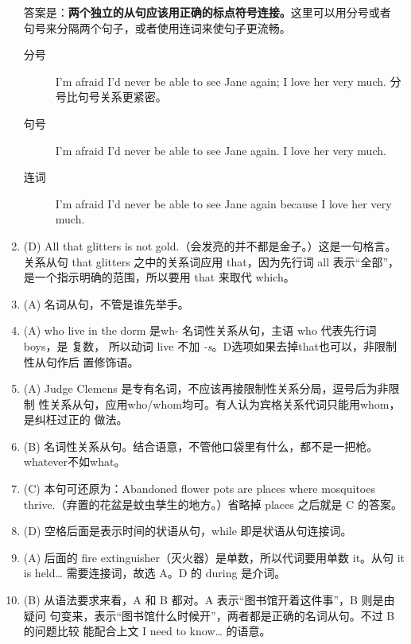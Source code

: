 \begin{enumerate}
  答案是：\textbf{两个独立的从句应该用正确的标点符号连接。}这里可以用分号或者
  句号来分隔两个句子，或者使用连词来使句子更流畅。
  \begin{description}
  \item[分号] I'm afraid I'd never be able to see Jane again; I love
    her very much. 分号比句号关系更紧密。
  \item[句号] I'm afraid I'd never be able to see Jane again. I love her
    very much.
  \item[连词] I'm afraid I'd never be able to see Jane again because I love
    her very much.
  \end{description}

\item (D) All that glitters is not gold.（会发亮的并不都是金子。）这是一句格言。
  关系从句 that glitters 之中的关系词应用 that，因为先行词 all 表示“全部”，
  是一个指示明确的范围，所以要用 that 来取代 which。

\item (A) 名词从句，不管是谁先举手。

\item (A) who live in the dorm 是wh- 名词性关系从句，主语 who 代表先行词 boys，是
  复数， 所以动词 live 不加 \emph{-s}。D选项如果去掉that也可以，非限制性从句作后
  置修饰语。

\item (A) Judge Clemens 是专有名词，不应该再接限制性关系分局，逗号后为非限制
  性关系从句，应用who/whom均可。有人认为宾格关系代词只能用whom，是纠枉过正的
  做法。

\item (B) 名词性关系从句。结合语意，不管他口袋里有什么，都不是一把枪。
  whatever不如what。

\item (C) 本句可还原为：Abandoned flower pots are places where mosquitoes
  thrive.（弃置的花盆是蚊虫孳生的地方。）省略掉 places 之后就是 C 的答案。


\item (D) 空格后面是表示时间的状语从句，while 即是状语从句连接词。

\item  (A) 后面的 fire extinguisher（灭火器）是单数，所以代词要用单数 it。从句 it is held… 需要连接词，故选 A。D 的 during 是介词。

\item (B) 从语法要求来看，A 和 B 都对。A 表示“图书馆开着这件事”，B 则是由疑问
  句变来，表示“图书馆什么时候开”，两者都是正确的名词从句。不过 B 的问题比较
  能配合上文 I need to know… 的语意。
\end{enumerate}


